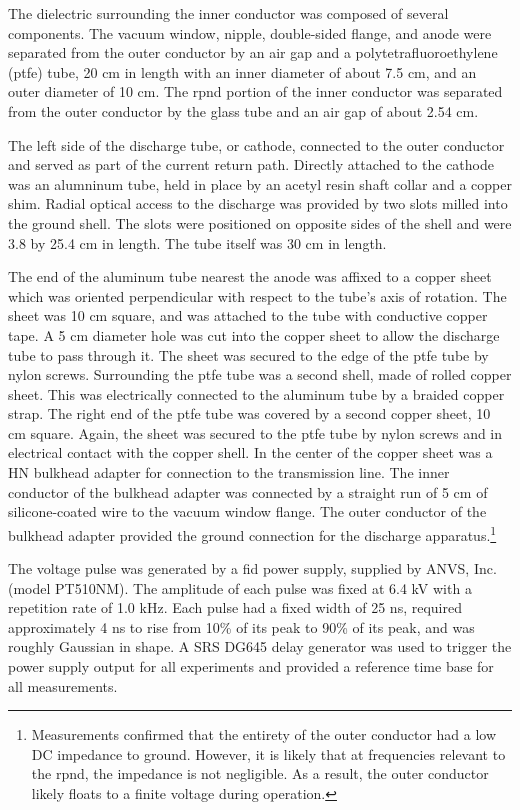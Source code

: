 The dielectric surrounding the inner conductor was composed of several
components. The vacuum window, nipple, double-sided flange, and anode were
separated from the outer conductor by an air gap and a polytetrafluoroethylene
(\acs{ptfe}) tube, 20 cm in length with an inner diameter of about 7.5 cm, and
an outer diameter of 10 cm. The \acs{rpnd} portion of the inner conductor was
separated from the outer conductor by the glass tube and an air gap of about
2.54 cm.

The left side of the discharge tube, or cathode, connected to the outer
conductor and served as part of the current return path. Directly attached to
the cathode was an alumninum tube, held in place by an acetyl resin shaft collar
and a copper shim. Radial optical access to the discharge was provided by two
slots milled into the ground shell. The slots were positioned on opposite sides
of the shell and were 3.8 by 25.4 cm in length. The tube itself was 30 cm in
length.

The end of the aluminum tube nearest the anode was affixed to a copper sheet
which was oriented perpendicular with respect to the tube's axis of rotation.
The sheet was 10 cm square, and was attached to the tube with conductive copper
tape. A 5 cm diameter hole was cut into the copper sheet to allow the discharge
tube to pass through it. The sheet was secured to the edge of the \acs{ptfe}
tube by nylon screws. Surrounding the \acs{ptfe} tube was a second shell, made
of rolled copper sheet. This was electrically connected to the aluminum tube by
a braided copper strap. The right end of the \acs{ptfe} tube was covered by a
second copper sheet, 10 cm square. Again, the sheet was secured to the
\acs{ptfe} tube by nylon screws and in electrical contact with the copper shell.
In the center of the copper sheet was a HN bulkhead adapter for connection to
the transmission line. The inner conductor of the bulkhead adapter was connected
by a straight run of 5 cm of silicone-coated wire to the vacuum window flange.
The outer conductor of the bulkhead adapter provided the ground connection for
the discharge apparatus.\footnote{Measurements confirmed that the entirety of
the outer conductor had a low DC impedance to ground. However, it is likely that
at frequencies relevant to the \acs{rpnd}, the impedance is not negligible. As a
result, the outer conductor likely floats to a finite voltage during operation.}

The voltage pulse was generated by a \acs{fid} power supply, supplied by ANVS,
Inc. (model PT510NM). The amplitude of each pulse was fixed at 6.4 kV with a
repetition rate of 1.0 kHz. Each pulse had a fixed width of 25 ns, required
approximately 4 ns to rise from 10\% of its peak to 90\% of its peak, and was
roughly Gaussian in shape. A SRS DG645 delay generator was used to trigger the
power supply output for all experiments and provided a reference time base for
all measurements.

